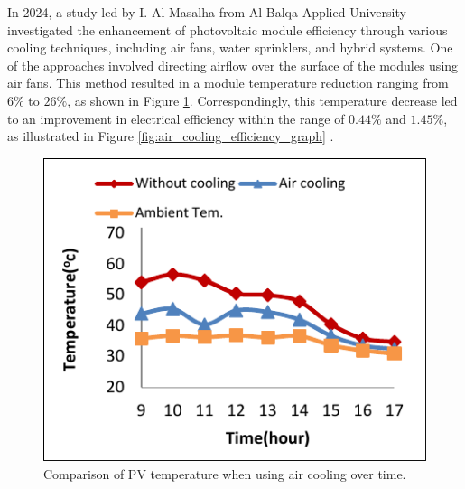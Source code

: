 In 2024, a study led by I. Al-Masalha from Al-Balqa Applied University investigated the enhancement of photovoltaic module efficiency through various cooling techniques, including air fans, water sprinklers, and hybrid systems. One of the approaches involved directing airflow over the surface of the modules using air fans. This method resulted in a module temperature reduction ranging from $6\%$ to $26\%$, as shown in Figure \ref{fig:air_cooling_temperature_graph}. Correspondingly, this temperature decrease led to an improvement in electrical efficiency within the range of $0.44\%$ and $1.45\%$, as illustrated in Figure \ref{fig:air_cooling_efficiency_graph} \cite{Al-Masalha2024ImprovingSystems}.

\begin{figure}[ht]
    \centering
    \begin{minipage}[b]{0.45\linewidth}
        \centering
        \includegraphics[width=\linewidth]{Figures/air_cooling_temperature_graph.pdf}
        \caption{Comparison of PV temperature when using air cooling over time. \cite{Al-Masalha2024ImprovingSystems}}
        \label{fig:air_cooling_temperature_graph}
    \end{minipage}
    \hfill
    \begin{minipage}[b]{0.45\linewidth}
        \centering

\end{minipage}
\end{figure}
